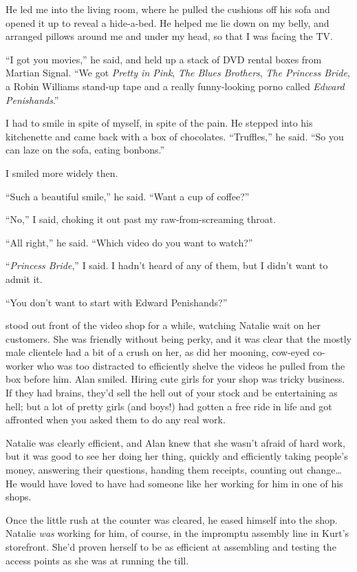He led me into the living room, where he pulled the cushions off his
sofa and opened it up to reveal a hide-a-bed.  He helped me lie down
on my belly, and arranged pillows around me and under my head, so that
I was facing the TV.

``I got you movies,'' he said, and held up a stack of DVD rental boxes
from Martian Signal.  ``We got \textit{Pretty in Pink}, \textit{The
Blues Brothers}, \textit{The Princess Bride}, a Robin Williams
stand-up tape and a really funny-looking porno called \textit{Edward
Penishands}.''

I had to smile in spite of myself, in spite of the pain.  He stepped
into his kitchenette and came back with a box of chocolates. 
``Truffles,'' he said.  ``So you can laze on the sofa, eating
bonbons.''

I smiled more widely then.

``Such a beautiful smile,'' he said.  ``Want a cup of coffee?''

``No,'' I said, choking it out past my raw-from-screaming throat.

``All right,'' he said.  ``Which video do you want to watch?''

``\textit{Princess Bride},'' I said.  I hadn't heard of any of them,
but I didn't want to admit it.

``You don't want to start with Edward Penishands?''

 stood out front of the video shop for a while, watching Natalie
wait on her customers.  She was friendly without being perky, and it
was clear that the mostly male clientele had a bit of a crush on her,
as did her mooning, cow-eyed co-worker who was too distracted to
efficiently shelve the videos he pulled from the box before him.  Alan
smiled.  Hiring cute girls for your shop was tricky business.  If they
had brains, they'd sell the hell out of your stock and be entertaining
as hell; but a lot of pretty girls (and boys!) had gotten a free ride
in life and got affronted when you asked them to do any real work.

Natalie was clearly efficient, and Alan knew that she wasn't afraid of
hard work, but it was good to see her doing her thing, quickly and
efficiently taking people's money, answering their questions, handing
them receipts, counting out change\ldots{}  He would have loved to have had
someone like her working for him in one of his shops.

Once the little rush at the counter was cleared, he eased himself into
the shop.  Natalie \textit{was} working for him, of course, in the
impromptu assembly line in Kurt's storefront.  She'd proven herself to
be as efficient at assembling and testing the access points as she was
at running the till.

